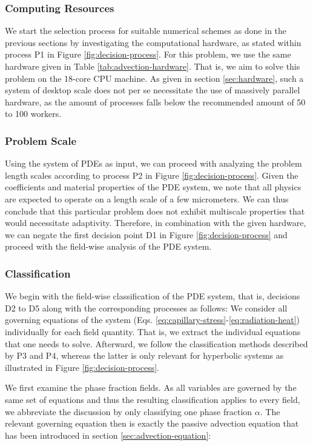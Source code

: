 \documentclass[asi,article,submit,moreauthors]{Definitions/mdpi}
\begin{document}
\subsubsection{Computing Resources}

We start the selection process for suitable numerical schemes as done in the previous sections by investigating the computational hardware, as stated within process P1 in Figure \ref{fig:decision-process}.
For this problem, we use the same hardware given in Table \ref{tab:advection-hardware}.
That is, we aim to solve this problem on the 18-core CPU machine.
As given in section \ref{sec:hardware}, such a system of desktop scale does not per se necessitate the use of massively parallel hardware, as the amount of processes falls below the recommended amount of 50 to 100 workers.

\subsubsection{Problem Scale}

Using the system of PDEs as input, we can proceed with analyzing the problem length scales according to process P2 in Figure \ref{fig:decision-process}.
Given the coefficients and material properties of the PDE system, we note that all physics are expected to operate on a length scale of a few micrometers.
We can thus conclude that this particular problem does not exhibit multiscale properties that would necessitate adaptivity.
Therefore, in combination with the given hardware, we can negate the first decision point D1 in Figure \ref{fig:decision-process} and proceed with the field-wise analysis of the PDE system.

\subsubsection{Classification}

We begin with the field-wise classification of the PDE system, that is,  decisions D2 to D5 along with the corresponding processes as follows:
We consider all governing equations of the system (Eqs. \ref{eq:capillary-stress}-\ref{eq:radiation-heat}) individually for each field quantity. That is, we extract the individual equations that one needs to solve.
Afterward, we follow the classification methods described by P3 and P4, whereas the latter is only relevant for hyperbolic systems as illustrated in Figure \ref{fig:decision-process}.

We first examine the phase fraction fields.
As all variables are governed by the same set of equations and thus the resulting classification applies to every field, we abbreviate the discussion by only classifying one phase fraction $\alpha$.
The relevant governing equation then is exactly the passive advection equation that has been introduced in section \ref{sec:advection-equation}:
\end{document}
